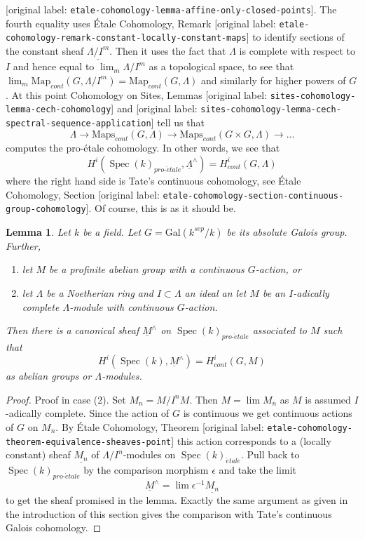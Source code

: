 \documentclass[10pt,a4paper]{article}
\theoremstyle{plain}
\newtheorem{lemma}[subsection]{Lemma}
\theoremstyle{definition}
\theoremstyle{remark}
\numberwithin{equation}{subsection}
\def\lim{\mathop{\mathrm{lim}}\nolimits}
\def\Spec{\mathop{\mathrm{Spec}}}
\def\proetale{{pro\text{-}\acute{e}tale}}
\def\etale{{\acute{e}tale}}
\begin{document}
[original label: \nolinkurl{etale-cohomology-lemma-affine-only-closed-points}].
The fourth equality uses
\'Etale Cohomology, Remark
[original label: \nolinkurl{etale-cohomology-remark-constant-locally-constant-maps}]
to identify sections of the constant sheaf $\underline{\Lambda/I^m}$.
Then it uses the fact that $\Lambda$ is complete with respect to $I$
and hence equal to $\lim_m \Lambda/I^m$ as a topological space, to see that
$\lim_m \text{Map}_{cont}(G, \Lambda/I^m) = \text{Map}_{cont}(G, \Lambda)$
and similarly for higher powers of $G$.
At this point Cohomology on Sites, Lemmas
[original label: \nolinkurl{sites-cohomology-lemma-cech-cohomology}]  and
[original label: \nolinkurl{sites-cohomology-lemma-cech-spectral-sequence-application}]
tell us that
$$
\Lambda \to \text{Maps}_{cont}(G, \Lambda) \to
\text{Maps}_{cont}(G \times G, \Lambda) \to \ldots
$$
computes the pro-\'etale cohomology. In other words, we see that
$$
H^i(\Spec(k)_\proetale, \underline{\Lambda}^\wedge)
=
H^i_{cont}(G, \Lambda)
$$
where the right hand side is Tate's continuous cohomology, see
\'Etale Cohomology, Section
[original label: \nolinkurl{etale-cohomology-section-continuous-group-cohomology}].
Of course, this is as it should be.

\begin{lemma}
\label{lemma-more-general-point}
Let $k$ be a field. Let $G = \text{Gal}(k^{sep}/k)$ be its absolute
Galois group. Further, 
\begin{enumerate}
\item let $M$ be a profinite abelian group with a continuous
$G$-action, or
\item let $\Lambda$ be a Noetherian ring and $I \subset \Lambda$ an ideal
an let $M$ be an $I$-adically complete $\Lambda$-module with continuous
$G$-action.
\end{enumerate}
Then there is a canonical sheaf $\underline{M}^\wedge$ on
$\Spec(k)_\proetale$ associated to $M$ such that
$$
H^i(\Spec(k), \underline{M}^\wedge) = H^i_{cont}(G, M)
$$
as abelian groups or $\Lambda$-modules.
\end{lemma}

\begin{proof}
Proof in case (2). Set $M_n = M/I^nM$. Then $M = \lim M_n$ as $M$ is
assumed $I$-adically complete. Since the action of $G$ is continuous
we get continuous actions of $G$ on $M_n$. By \'Etale Cohomology, Theorem
[original label: \nolinkurl{etale-cohomology-theorem-equivalence-sheaves-point}]
this action corresponds to a (locally constant) sheaf
$\underline{M_n}$ of $\Lambda/I^n$-modules on $\Spec(k)_\etale$.
Pull back to $\Spec(k)_\proetale$ by the comparison morphism
$\epsilon$ and take the limit
$$
\underline{M}^\wedge = \lim \epsilon^{-1}\underline{M_n}
$$
to get the sheaf promised in the lemma. Exactly the same argument as
given in the introduction of this section gives the comparison
with Tate's continuous Galois cohomology.
\end{proof}
\end{document}
